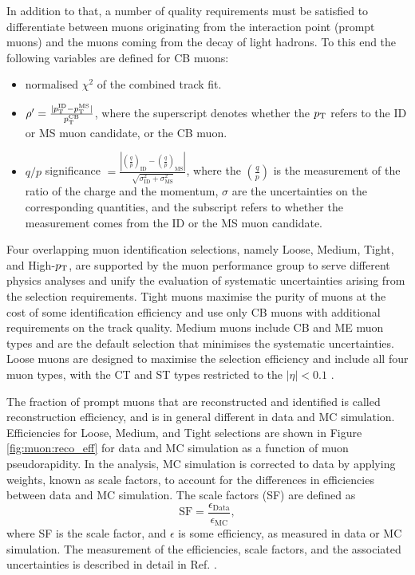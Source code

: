 In addition to that, a number of quality requirements must be
satisfied to differentiate between muons originating from the
interaction point (prompt muons) and the muons coming from the
decay of light hadrons. To this end the following variables are
defined for CB muons:
\begin{itemize}
\item normalised $\chi^2$ of the combined track fit.
\item $\rho' = \frac{|p_{\text{T}}^{\text{ID}} - p_{\text{T}}^{\text{MS}}|}{p_{\text{T}}^{\text{CB}}}$,
where the superscript denotes whether the $p_{\text{T}}$ refers to the
ID or MS muon candidate, or the CB muon.
\item $q/p$ significance $ = \frac{\left|\left(\frac{q}{p}\right)_\text{ID}
- \left(\frac{q}{p}\right)_\text{MS}\right|}
{\sqrt{\sigma^2_\text{ID} + \sigma^2_\text{MS}}}$,
where the $\left(\frac{q}{p}\right)$ is the measurement of the ratio of
the charge and the momentum, $\sigma$ are the uncertainties on
the corresponding quantities, and the subscript refers to whether
the measurement comes from the ID or the MS muon candidate.
\end{itemize}

Four overlapping muon identification selections, namely Loose, Medium, Tight,
and High-$p_{\text{T}}$, are supported by the muon performance group to 
serve different physics analyses and unify the evaluation of
systematic uncertainties arising from the selection requirements.
Tight muons maximise the purity of muons at the cost of some
identification efficiency and use only CB muons with additional
requirements on the track quality. Medium muons include CB and ME
muon types and are the default selection that minimises the systematic
uncertainties. Loose muons are designed to maximise the selection
efficiency and include all four muon types, with the CT and ST types
restricted to the $|\eta| < 0.1$ \cite{Aad:2016jkr}.

The fraction of prompt muons that are reconstructed and identified
is called reconstruction efficiency, and is in general different
in data and MC simulation. Efficiencies for Loose, Medium, and Tight
selections are shown in Figure \ref{fig:muon:reco_eff} for data and
MC simulation as a function of muon pseudorapidity. In the analysis,
MC simulation is corrected to data by applying weights, known as
scale factors, to account for the differences in efficiencies between
data and MC simulation. The scale factors (SF) are defined as
\begin{equation}
\text{SF} = \frac{\epsilon_\text{Data}}{\epsilon_\text{MC}},
\end{equation}
where SF is the scale factor, and $\epsilon$ is some efficiency,
as measured in data or MC simulation. The measurement of the
efficiencies, scale factors, and the associated
uncertainties is described in detail in Ref. \cite{Aad:2016jkr}.


